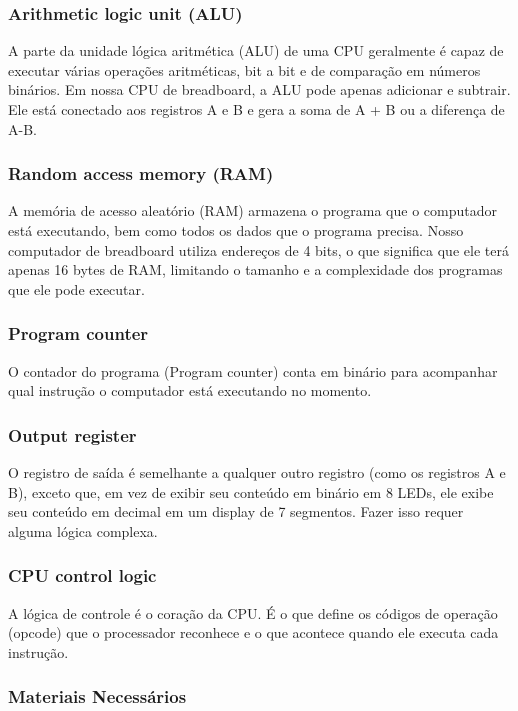 \subsubsection{Arithmetic logic unit (ALU)}
A parte da unidade lógica aritmética (ALU) de uma CPU geralmente é capaz de executar várias operações aritméticas, bit a bit e de comparação em números binários. Em nossa CPU de breadboard, a ALU pode apenas adicionar e subtrair. Ele está conectado aos registros A e B e gera a soma de A + B ou a diferença de A-B.

\subsubsection{Random access memory (RAM)}
A memória de acesso aleatório (RAM) armazena o programa que o computador está executando, bem como todos os dados que o programa precisa. Nosso computador de breadboard utiliza endereços de 4 bits, o que significa que ele terá apenas 16 bytes de RAM, limitando o tamanho e a complexidade dos programas que ele pode executar.

\subsubsection{Program counter}
O contador do programa (Program counter) conta em binário para acompanhar qual instrução o computador está executando no momento.

\subsubsection{Output register}
O registro de saída é semelhante a qualquer outro registro (como os registros A e B), exceto que, em vez de exibir seu conteúdo em binário em 8 LEDs, ele exibe seu conteúdo em decimal em um display de 7 segmentos. Fazer isso requer alguma lógica complexa.

\subsubsection{CPU control logic}
A lógica de controle é o coração da CPU. É o que define os códigos de operação (opcode) que o processador reconhece e o que acontece quando ele executa cada instrução.

\subsubsection{Materiais Necessários}

\newpage